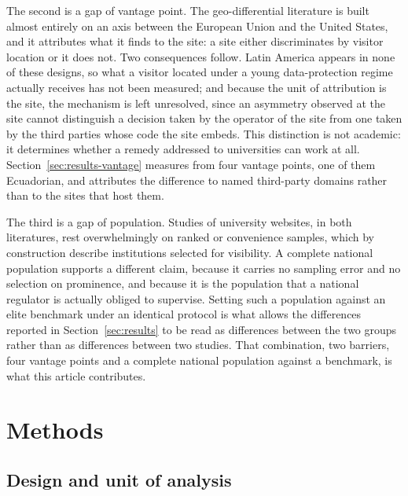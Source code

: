 \documentclass[pdflatex,sn-basic,Numbered,iicol]{sn-jnl}
\theoremstyle{thmstyleone}
\theoremstyle{thmstyletwo}
\theoremstyle{thmstylethree}
\begin{document}
The second is a gap of vantage point. The geo-differential literature is built almost entirely on an axis between the European Union and the United States, and it attributes what it finds to the site: a site either discriminates by visitor location or it does not. Two consequences follow. Latin America appears in none of these designs, so what a visitor located under a young data-protection regime actually receives has not been measured; and because the unit of attribution is the site, the mechanism is left unresolved, since an asymmetry observed at the site cannot distinguish a decision taken by the operator of the site from one taken by the third parties whose code the site embeds. This distinction is not academic: it determines whether a remedy addressed to universities can work at all. Section~\ref{sec:results-vantage} measures from four vantage points, one of them Ecuadorian, and attributes the difference to named third-party domains rather than to the sites that host them.

The third is a gap of population. Studies of university websites, in both literatures, rest overwhelmingly on ranked or convenience samples, which by construction describe institutions selected for visibility. A complete national population supports a different claim, because it carries no sampling error and no selection on prominence, and because it is the population that a national regulator is actually obliged to supervise. Setting such a population against an elite benchmark under an identical protocol is what allows the differences reported in Section~\ref{sec:results} to be read as differences between the two groups rather than as differences between two studies. That combination, two barriers, four vantage points and a complete national population against a benchmark, is what this article contributes.

\section{Methods}\label{sec:methods}

\subsection{Design and unit of analysis}\label{sec:methods-design}
\end{document}
